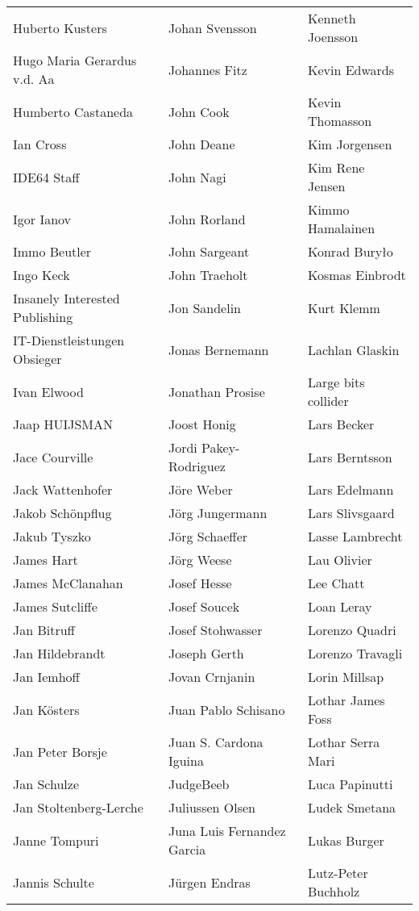 \begin{tabular}{p{4.5cm}p{4.5cm}p{4.5cm}}
Huberto Kusters & Johan Svensson & Kenneth Joensson \\
Hugo Maria Gerardus v.d. Aa & Johannes Fitz & Kevin Edwards \\
Humberto Castaneda & John Cook & Kevin Thomasson \\
Ian Cross & John Deane & Kim Jorgensen \\
IDE64 Staff & John Nagi & Kim Rene Jensen \\
Igor Ianov & John Rorland & Kimmo Hamalainen \\
Immo Beutler & John Sargeant & Konrad Buryło \\
Ingo Keck & John Traeholt & Kosmas Einbrodt \\
Insanely Interested Publishing & Jon Sandelin & Kurt Klemm \\
IT-Dienstleistungen Obsieger & Jonas Bernemann & Lachlan Glaskin \\
Ivan Elwood & Jonathan Prosise & Large bits collider \\
Jaap HUIJSMAN & Joost Honig & Lars Becker \\
Jace Courville & Jordi Pakey-Rodriguez & Lars Berntsson \\
Jack Wattenhofer & Jöre Weber & Lars Edelmann \\
Jakob Schönpflug & Jörg Jungermann & Lars Slivsgaard \\
Jakub Tyszko & Jörg Schaeffer & Lasse Lambrecht \\
James Hart & Jörg Weese & Lau Olivier \\
James McClanahan & Josef Hesse & Lee Chatt \\
James Sutcliffe & Josef Soucek & Loan Leray \\
Jan Bitruff & Josef Stohwasser & Lorenzo Quadri \\
Jan Hildebrandt & Joseph Gerth & Lorenzo Travagli \\
Jan Iemhoff & Jovan Crnjanin & Lorin Millsap \\
Jan Kösters & Juan Pablo Schisano & Lothar James Foss \\
Jan Peter Borsje & Juan S. Cardona Iguina & Lothar Serra Mari \\
Jan Schulze & JudgeBeeb & Luca Papinutti \\
Jan Stoltenberg-Lerche & Juliussen Olsen & Ludek Smetana \\
Janne Tompuri & Juna Luis Fernandez Garcia & Lukas Burger \\
Jannis Schulte & Jürgen Endras & Lutz-Peter Buchholz \\

\end{tabular}

